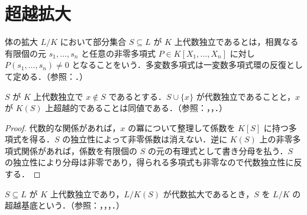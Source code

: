 \section{超越拡大}
\begin{defn}[代数独立]
体の拡大 $L/K$ において部分集合 $S\subseteq L$ が $K$ 上代数独立であるとは，相異なる有限個の元 $s_1,\ldots,s_n$ と任意の非零多項式 $P\in K[X_1,\ldots,X_n]$ に対し $P(s_1,\ldots,s_n)\ne0$ となることをいう．多変数多項式は一変数多項式環の反復として定める．（参照：．）
\end{defn}
\begin{prop}[代数独立と超越元]
$S$ が $K$ 上代数独立で $x\notin S$ であるとする．$S\cup\{x\}$ が代数独立であることと，$x$ が $K(S)$ 上超越的であることは同値である．（参照：，，．）
\end{prop}
\begin{proof}
代数的な関係があれば，$x$ の冪について整理して係数を $K[S]$ に持つ多項式を得る．$S$ の独立性によって非零係数は消えない．逆に $K(S)$ 上の非零多項式関係があれば，係数を有限個の $S$ の元の有理式として書き分母を払う．$S$ の独立性により分母は非零であり，得られる多項式も非零なので代数独立性に反する．
\end{proof}
\begin{defn}[超越基底]
$S\subseteq L$ が $K$ 上代数独立であり，$L/K(S)$ が代数拡大であるとき，$S$ を $L/K$ の超越基底という．（参照：，，，．）
\end{defn}
